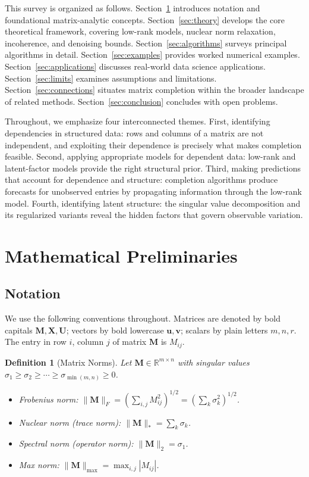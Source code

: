 \documentclass[conference]{IEEEtran}
\newtheorem{definition}{Definition}
\begin{document}
This survey is organized as follows. Section~\ref{sec:prelim} introduces notation and foundational matrix-analytic concepts. Section~\ref{sec:theory} develops the core theoretical framework, covering low-rank models, nuclear norm relaxation, incoherence, and denoising bounds. Section~\ref{sec:algorithms} surveys principal algorithms in detail. Section~\ref{sec:examples} provides worked numerical examples. Section~\ref{sec:applications} discusses real-world data science applications. Section~\ref{sec:limits} examines assumptions and limitations. Section~\ref{sec:connections} situates matrix completion within the broader landscape of related methods. Section~\ref{sec:conclusion} concludes with open problems.

Throughout, we emphasize four interconnected themes. First, identifying dependencies in structured data: rows and columns of a matrix are not independent, and exploiting their dependence is precisely what makes completion feasible. Second, applying appropriate models for dependent data: low-rank and latent-factor models provide the right structural prior. Third, making predictions that account for dependence and structure: completion algorithms produce forecasts for unobserved entries by propagating information through the low-rank model. Fourth, identifying latent structure: the singular value decomposition and its regularized variants reveal the hidden factors that govern observable variation.

\section{Mathematical Preliminaries}
\label{sec:prelim}

\subsection{Notation}

We use the following conventions throughout. Matrices are denoted by bold capitals $\mathbf{M}, \mathbf{X}, \mathbf{U}$; vectors by bold lowercase $\mathbf{u}, \mathbf{v}$; scalars by plain letters $m, n, r$. The entry in row $i$, column $j$ of matrix $\mathbf{M}$ is $M_{ij}$.

\begin{definition}[Matrix Norms]
Let $\mathbf{M} \in \mathbb{R}^{m \times n}$ with singular values $\sigma_1 \geq \sigma_2 \geq \cdots \geq \sigma_{\min(m,n)} \geq 0$.
\begin{itemize}
  \item \emph{Frobenius norm}: $\|\mathbf{M}\|_F = \left(\sum_{i,j} M_{ij}^2\right)^{1/2} = \left(\sum_k \sigma_k^2\right)^{1/2}$.
  \item \emph{Nuclear norm} (trace norm): $\|\mathbf{M}\|_* = \sum_k \sigma_k$.
  \item \emph{Spectral norm} (operator norm): $\|\mathbf{M}\|_2 = \sigma_1$.
  \item \emph{Max norm}: $\|\mathbf{M}\|_{\max} = \max_{i,j} |M_{ij}|$.
\end{itemize}
\end{definition}
\end{document}
